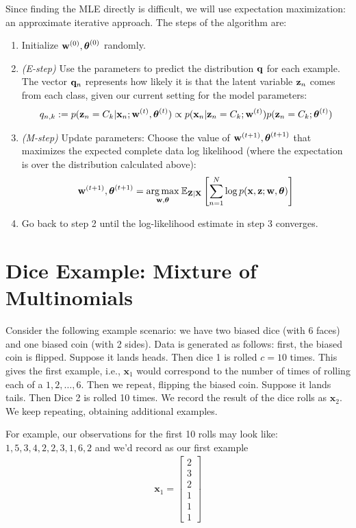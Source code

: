 \documentclass[12pt,letterpaper]{article}
\begin{document}
Since finding the MLE directly is difficult, we will use expectation maximization: an approximate iterative approach. The steps of the algorithm are:

\begin{enumerate}
    \item Initialize $\mathbf{w}^{(0)}, \boldsymbol{\theta}^{(0)}$ randomly.
    \item \textit{(E-step)} Use the parameters to predict the distribution $\mathbf{q}$ for each example. The vector $\mathbf{q}_n$ represents how likely it is that the latent variable $\mathbf{z}_n$ comes from each class, given our current setting for the model parameters:
    \begin{align} q_{n,k} := p(\mathbf{z}_n = C_k | \mathbf{x}_n; \mathbf{w}^{(t)}, \boldsymbol{\theta}^{(t)}) \propto p(\mathbf{x}_n | \mathbf{z}_n=C_k; \mathbf{w}^{(t)})p(\mathbf{z}_n=C_k; \boldsymbol{\theta}^{(t)})\end{align}
    \item \textit{(M-step)} Update parameters: Choose the value of $\mathbf{w}^{(t + 1)}, \boldsymbol{\theta}^{(t + 1)}$ that maximizes the expected complete data log likelihood (where the expectation is over the distribution calculated above):
    \begin{align}
    \boldw^{(t + 1)}, \btheta^{(t + 1)} = \underset{\boldw, \btheta}\argmax\: \mathbb{E}_{\boldZ | \boldX}\left[\sum_{n=1}^N \log p(\boldx, \boldz; \boldw, \btheta)\right]
    \end{align}
    \item Go back to step 2 until the log-likelihood estimate in step 3 converges.
\end{enumerate}


\section{Dice Example: Mixture of Multinomials}
\label{dice}
    
    Consider the following example scenario: we have two biased dice (with 6 faces) and one biased coin (with 2 sides). Data is generated as follows: first, the biased coin is flipped. Suppose it lands heads. Then dice 1 is rolled $c=10$ times. This gives the first example, i.e., $\mathbf{x}_1$ would correspond to the number of times of rolling each of a $1, 2, \ldots, 6$. Then we repeat, flipping the biased coin. Suppose it lands tails. Then Dice 2 is rolled 10 times. We record the result of the dice rolls as $\mathbf{x}_2$. We keep repeating, obtaining additional examples. 

   For example, our observations for the first 10 rolls may look like: 
    $    1, 5, 3, 4, 2, 2, 3, 1, 6, 2$ and we'd record as our first example
\begin{align*}
    \textbf{x}_1 =
        \begin{bmatrix}
            2 \\
            3 \\
            2 \\
            1 \\
            1 \\
            1
        \end{bmatrix} 
\end{align*}
\end{document}

